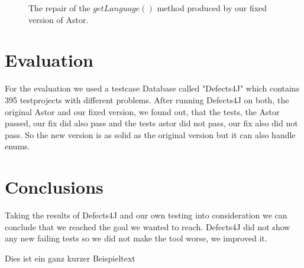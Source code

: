 \documentclass[pdftex,english,oribibl]{llncs}
\begin{document}
\begin{figure}
\begin{center}

\end{center}
\caption{The repair of the $getLanguage()$ method produced by our fixed version of Astor.}
\label{fig:fixed}
\end{figure}

\section{Evaluation}\label{sec:evaluation}
For the evaluation we used a testcase Database called "Defects4J" which contains 395 testprojects with different problems. After running Defects4J on both, the original Astor and our fixed version, we found out, that the tests, the Astor passed, our fix did also pass and the tests astor did not pass, our fix also did not pass. So the new version is as solid as the original version but it can also handle enums.

\section{Conclusions}\label{sec:conclusions}

 Taking the results of Defects4J and our own testing into consideration we can conclude that we reached the goal we wanted to reach. Defects4J did not show any new failing tests so we did not make the tool worse, we improved it.

Dies ist ein ganz kurzer Beispieltext \cite{AspectJ2007}


\end{document}
